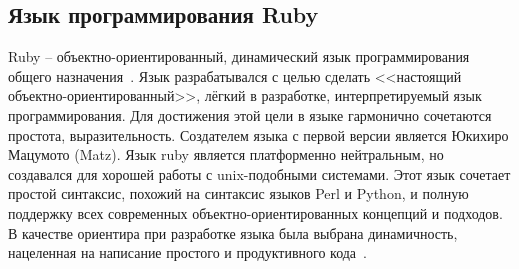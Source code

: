 \subsection{Язык программирования Ruby}
\label{sub:practice:ruby_overview}
Ruby -- объектно-ориентированный, динамический язык программирования общего назначения~\cite{ruby_site}.
Язык разрабатывался с целью сделать <<настоящий объектно-ориентированный>>, лёгкий в разработке, интерпретируемый язык программирования.
Для достижения этой цели в языке гармонично сочетаются простота, выразительность.
Создателем языка с первой версии является  Юкихиро Мацумото (Matz).
Язык ruby является платформенно нейтральным, но создавался для хорошей работы с unix-подобными системами.
Этот язык сочетает простой синтаксис, похожий на синтаксис языков Perl и Python, и полную поддержку всех современных объектно-ориентированных концепций и подходов. В качестве ориентира при разработке языка была выбрана динамичность, нацеленная на написание простого и продуктивного кода~\cite{trpr_2011_ru}.

